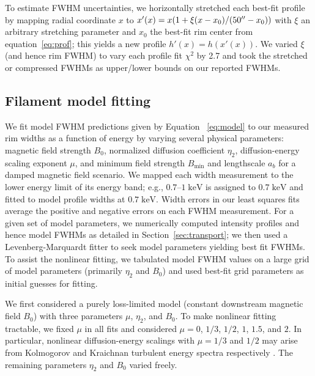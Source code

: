 \documentclass[iop, apj, numberedappendix]{emulateapj}
\newcommand*{\mt}{\mathrm}
\newcommand*{\unit}[1]{\;\mt{#1}}  %
\newcommand*{\Bmin}{B_{\mt{min}}}
\begin{document}
To estimate FWHM uncertainties, we horizontally stretched each best-fit
profile by mapping radial coordinate $x$ to
$x'(x) = x (1 + \xi (x-x_0)/(50\mbox{$^{\prime\prime}$}-x_0))$ with $\xi$ an arbitrary stretching
parameter and $x_0$ the best-fit rim center from equation~\eqref{eq:prof};
this yields a new profile $h'(x) = h(x'(x))$.
We varied $\xi$ (and hence rim FWHM) to vary each profile fit $\chi^2$ by 2.7
and took the stretched or compressed FWHMs as upper/lower bounds on our
reported FWHMs.

\subsection{Filament model fitting}
\label{sec:fits}

We fit model FWHM predictions given by Equation~ \eqref{eq:model} to our
measured rim widths as a function of energy by varying several physical
parameters: magnetic field strength $B_0$, normalized diffusion coefficient
$\eta_2$, diffusion-energy scaling exponent $\mu$, and minimum field strength
$\Bmin$ and lengthscale $a_b$ for a damped magnetic field scenario.  We
mapped each width measurement to the lower energy limit of its energy band;
e.g., $0.7$--$1 \unit{keV}$ is assigned to $0.7 \unit{keV}$ and fitted to model
profile widths at $0.7 \unit{keV}$.  Width errors in our least squares fits
average the positive and negative errors on each FWHM measurement.  For a given
set of model parameters, we numerically computed intensity profiles and
hence model FWHMs as detailed in Section~\ref{sec:transport}; we then used a
Levenberg-Marquardt fitter to seek model parameters yielding best fit FWHMs.
To assist the nonlinear fitting, we tabulated model FWHM values on a large grid
of model parameters (primarily $\eta_2$ and $B_0$) and used best-fit grid
parameters as initial guesses for fitting.

We first considered a purely loss-limited model (constant downstream magnetic
field $B_0$) with three parameters $\mu$, $\eta_2$, and $B_0$.  To make
nonlinear fitting tractable, we fixed $\mu$ in all fits and considered $\mu =
0$, $1/3$, $1/2$, $1$, $1.5$, and $2$.  In particular, nonlinear
diffusion-energy scalings with $\mu = 1/3$ and $1/2$ may arise from Kolmogorov
and Kraichnan turbulent energy spectra respectively \citep{reynolds2004}.  The
remaining parameters $\eta_2$ and $B_0$ varied freely.
\end{document}
